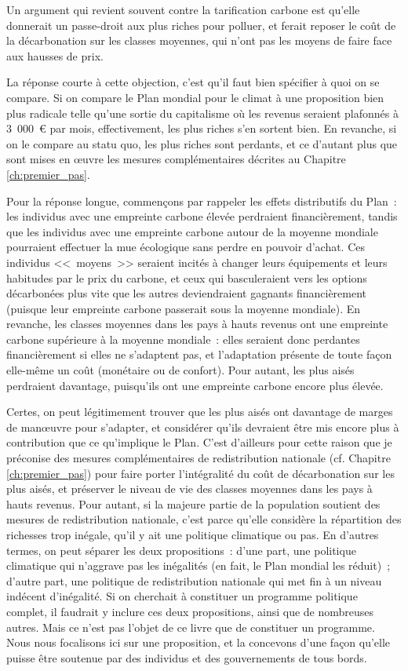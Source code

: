 \documentclass[a5paper,french,openany]{memoir}
\begin{document}
Un argument qui revient souvent contre la tarification carbone est qu'elle donnerait un passe-droit aux plus riches pour polluer, et ferait reposer le coût de la décarbonation sur les classes moyennes, qui n'ont pas les moyens de faire face aux hausses de prix. 

La réponse courte à cette objection, c'est qu'il faut bien spécifier à quoi on se compare. Si on compare le Plan mondial pour le climat à une proposition bien plus radicale telle qu'une sortie du capitalisme où les revenus seraient plafonnés à 3~000~\euro{} par mois, effectivement, les plus riches s'en sortent bien. En revanche, si on le compare au statu quo, les plus riches sont perdants, et ce d'autant plus que sont mises en œuvre les mesures complémentaires décrites au Chapitre \ref{ch:premier_pas}. 

Pour la réponse longue, commençons par rappeler les effets distributifs du Plan~: les individus avec une empreinte carbone élevée perdraient financièrement, tandis que les individus avec une empreinte carbone autour de la moyenne mondiale pourraient effectuer la mue écologique sans perdre en pouvoir d'achat. Ces individus <<~moyens~>> seraient incités à changer leurs équipements et leurs habitudes par le prix du carbone, et ceux qui basculeraient vers les options décarbonées plus vite que les autres deviendraient gagnants financièrement (puisque leur empreinte carbone passerait sous la moyenne mondiale). En revanche, les classes moyennes dans les pays à hauts revenus ont une empreinte carbone supérieure à la moyenne mondiale~: elles seraient donc perdantes financièrement si elles ne s'adaptent pas, et l'adaptation présente de toute façon elle-même un coût (monétaire ou de confort). Pour autant, les plus aisés perdraient davantage, puisqu'ils ont une empreinte carbone encore plus élevée. 

Certes, on peut légitimement trouver que les plus aisés ont davantage de marges de manœuvre pour s'adapter, et considérer qu'ils devraient être mis encore plus à contribution que ce qu'implique le Plan. C'est d'ailleurs pour cette raison que je préconise des mesures complémentaires de redistribution nationale (cf. Chapitre \ref{ch:premier_pas}) pour faire porter l'intégralité du coût de décarbonation sur les plus aisés, et préserver le niveau de vie des classes moyennes dans les pays à hauts revenus. Pour autant, si la majeure partie de la population soutient des mesures de redistribution nationale, c'est parce qu'elle considère la répartition des richesses trop inégale, qu'il y ait une politique climatique ou pas. En d'autres termes, on peut séparer les deux propositions~: d'une part, une politique climatique qui n'aggrave pas les inégalités (en fait, le Plan mondial les réduit)~; d'autre part, une politique de redistribution nationale qui met fin à un niveau indécent d'inégalité. Si on cherchait à constituer un programme politique complet, il faudrait y inclure ces deux propositions, ainsi que de nombreuses autres. Mais ce n'est pas l'objet de ce livre que de constituer un programme. Nous nous focalisons ici sur une proposition, et la concevons d'une façon qu'elle puisse être soutenue par des individus et des gouvernements de tous bords. 
\end{document}
